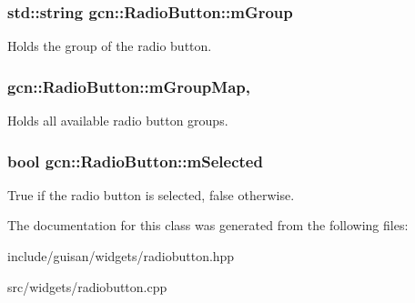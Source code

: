 \subsubsection[{\texorpdfstring{m\+Group}{mGroup}}]{\setlength{\rightskip}{0pt plus 5cm}std\+::string gcn\+::\+Radio\+Button\+::m\+Group\hspace{0.3cm}{\ttfamily [protected]}}\hypertarget{classgcn_1_1RadioButton_afa88aecb7276f8d671e24465e4e1c944}{}\label{classgcn_1_1RadioButton_afa88aecb7276f8d671e24465e4e1c944}
Holds the group of the radio button. 
\subsubsection[{\texorpdfstring{m\+Group\+Map}{mGroupMap}}]{ gcn\+::\+Radio\+Button\+::m\+Group\+Map\hspace{0.3cm}{\ttfamily [static]}, {\ttfamily [protected]}}\hypertarget{classgcn_1_1RadioButton_afffd36379e905ff1160cf475a784ad02}{}\label{classgcn_1_1RadioButton_afffd36379e905ff1160cf475a784ad02}
Holds all available radio button groups. 
\subsubsection[{\texorpdfstring{m\+Selected}{mSelected}}]{\setlength{\rightskip}{0pt plus 5cm}bool gcn\+::\+Radio\+Button\+::m\+Selected\hspace{0.3cm}{\ttfamily [protected]}}\hypertarget{classgcn_1_1RadioButton_a303f5ff2b0408763521cbb3c914eadf7}{}\label{classgcn_1_1RadioButton_a303f5ff2b0408763521cbb3c914eadf7}
True if the radio button is selected, false otherwise. 

The documentation for this class was generated from the following files\+:\begin{DoxyCompactItemize}
\item 
include/guisan/widgets/radiobutton.\+hpp\item 
src/widgets/radiobutton.\+cpp\end{DoxyCompactItemize}
